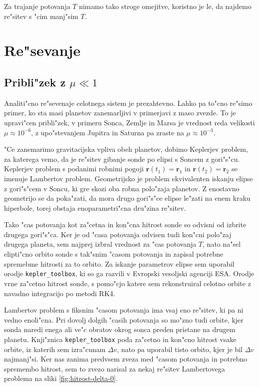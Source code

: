 \documentclass[a4paper,10pt]{article}
\renewcommand{\vec}{\mathbf}
\begin{document}
Za trajanje potovanja $T$ nimamo tako stroge omejitve, koristno je le, da najdemo re"sitev s "cim manj"sim $T$. 

\section{Re"sevanje}

\subsection{Pribli"zek z $\mu \ll 1$}
Analiti"cno re"sevenaje celotnega sistem je prezahtevno. Lahko pa to"cno re"simo primer, ko sta masi planetov zanemarljivi v primerjavi z maso zvezde. To je upravi"cen pribli"zek, v primeru Sonca, Zemlje in Marsa je vrednost reda velikosti $\mu \approx 10^{-6}$, z upo"stevanjem Jupitra in Saturna pa zraste na $\mu \approx 10^{-3}$. 

"Ce zanemarimo gravitacijska vpliva obeh planetov, dobimo Keplerjev problem, za katerega vemo, da je re"sitev gibanje sonde po elipsi s Soncem z gori"s"cu. Keplerjev problem s podanimi robnimi pogoji $\vec r(t_1) = \vec r_1$ in $\vec r(t_2) = \vec r_2$ se imenuje Lambertov problem\cite{wiki:lambert}. Geometrijsko je problem ekvivalenten iskanju elipse z gori"s"cem v Soncu, ki gre skozi oba robna polo"zaja planetov. Z enostavno geometrijo se da poka"zati, da mora drugo gori"s"ce elipse le"zati na enem kraku hiperbole, torej obstaja enoparametri"cna dru"zina re"sitev. 

Tako "cas potovanja kot za"cetna in kon"cna hitrost sonde so odvisni od izbrite drugega gori"s"ca. Ker je od "casa potovanja odvisen tudi kon"cni polo"zaj drugega planeta, sem najprej izbral vrednost za "cas potovanja $T$, nato na"sel elipti"cno orbito sonde s tak"snim "casom potovanja in zapisal potrebne spremebme hitrosti za to orbito. Za iskanje parametrov elipse sem uporabil orodje \texttt{kepler\_toolbox}\cite{toolbox}, ki so ga razvili v Evropski vesoljski agenciji ESA. Orodje vrne za"cetno hitrost sonde, s pomo"cjo katere sem rekonstruiral celotno orbite z navadno integracijo po metodi RK4. 

Lambertov problem s fiksnim "casom potovanja ima vsaj eno re"sitev, ki pa ni vedno enoli"cna. Pri dovolj dolgih "casih potovanja so mo"zno tudi orbite, kjer sonda naredi enega ali ve"c obratov okrog sonca preden pristane na drugem planetu. Knji"znica \texttt{kepler\_toolbox} poda za"cetno in kon"cno hitrost vsake orbite, iz katerih sem izra"cunam $\Delta v$, nato pa uporabil tisto orbito, kjer je bil $\Delta v$ najmanj"si. Ker nas zanima predvsem zveza med "casom potovanja in potrebno spremembo hitrost, sem to zvezo narisal za nekaj re"sitev Lambertovega problema na sliki \ref{fig:hitrost-delta-0}. 
\end{document}
